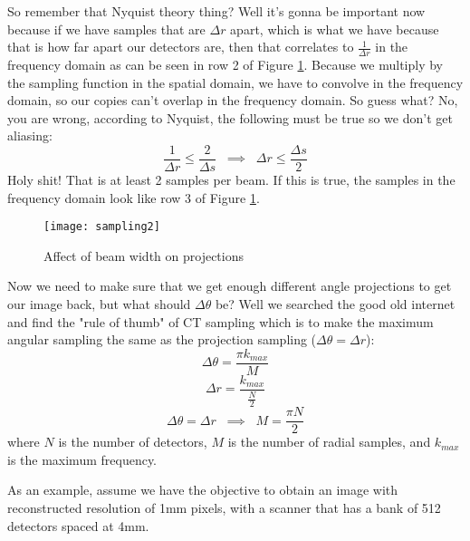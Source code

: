 So remember that Nyquist theory thing? Well it's gonna be important now because if we have samples that are $\Delta r$ apart, which is what we have because that is how far apart our detectors are, then that correlates to $\frac{1}{\Delta r}$ in the frequency domain as can be seen in row 2 of Figure \ref{fig:ct:samp2}. Because we multiply by the sampling function in the spatial domain, we have to convolve in the frequency domain, so our copies can't overlap in the frequency domain. So guess what? No, you are wrong, according to Nyquist, the following must be true so we don't get aliasing:
\begin{equation}
\frac{1}{\Delta r} \leq \frac{2}{\Delta s} \; \; \implies \; \; \Delta r \leq \frac{\Delta s}{2}
\end{equation}
Holy shit! That is at least 2 samples per beam. If this is true, the samples in the frequency domain look like row 3 of Figure \ref{fig:ct:samp2}.
\begin{figure}[ht]
	\centering
	\texttt{[image: sampling2]}
	\caption{Affect of beam width on projections}
	\label{fig:ct:samp2}
\end{figure}
Now we need to make sure that we get enough different angle projections to get our image back, but what should $\Delta \theta$ be? Well we searched the good old internet and find the "rule of thumb" of CT sampling which is to make the maximum angular sampling the same as the projection sampling ($\Delta \theta = \Delta r$):
\begin{equation}
\Delta \theta = \frac{\pi k_{max}}{M}
\end{equation}
\begin{equation}
\Delta r = \frac{k_{max}}{\frac{N}{2}} 
\end{equation}
\begin{equation}
\Delta \theta = \Delta r \; \; \implies \; \; M = \frac{\pi N}{2}
\end{equation}
where $N$ is the number of detectors, $M$ is the number of radial samples, and $k_{max}$ is the maximum frequency. 

As an example, assume we have the objective to obtain an image with reconstructed resolution of 1mm pixels, with a scanner that has a bank of 512 detectors spaced at 4mm.